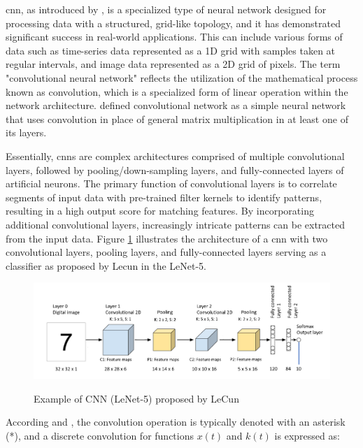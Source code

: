 \gls{cnn}, as introduced by \textcite{Lecun1998}, is a specialized type of neural network designed for processing data with a structured, grid-like topology, and it has demonstrated significant success in real-world applications. This can include various forms of data such as time-series data represented as a 1D grid with samples taken at regular intervals, and image data represented as a 2D grid of pixels. The term "convolutional neural network" reflects the utilization of the mathematical process known as convolution, which is a specialized form of linear operation within the network architecture. \textcite{Goodfellow2016} defined convolutional network as a simple neural network that uses convolution in place of general matrix multiplication in at least one of its layers.

Essentially, \gls{cnn}s are complex architectures comprised of multiple convolutional layers, followed by pooling/down-sampling layers, and fully-connected layers of artificial neurons. The primary function of convolutional layers is to correlate segments of input data with pre-trained filter kernels to identify patterns, resulting in a high output score for matching features. By incorporating additional convolutional layers, increasingly intricate patterns can be extracted from the input data. Figure \ref{fig:frmwk_cnn_LeNet-5} illustrates the architecture of a \gls{cnn} with two convolutional layers, pooling layers, and fully-connected layers serving as a classifier as proposed by Lecun in the LeNet-5.

\begin{figure}[htbp]
    \raggedright
        \caption{Example of CNN (LeNet-5) proposed by LeCun}
        \includegraphics[width=1\textwidth]{resources/images/030-theoretical_framework/Framework_cnn_LeNet-5.png}
        \label{fig:frmwk_cnn_LeNet-5}
\end{figure}

According \textcite{Goodfellow2016} and \textcite{Rothmund2018}, the convolution operation is typically denoted with an asterisk (*), and a discrete convolution for functions $x(t)$ and $k(t)$ is expressed as:

